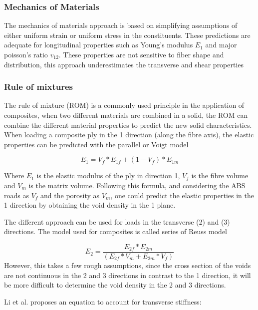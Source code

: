 \subsubsection{Mechanics of Materials}
The mechanics of materials approach is based on simplifying assumptions of either uniform strain or uniform stress in the constituents. These predictions are adequate for longitudinal properties such as Young's modulus $E_1$ and major poisson's ratio $v_{12}$. These properties are not sensitive to fiber shape and distribution, this approach underestimates the transverse and shear properties\cite{Daniel2006EngineeringMaterials}

\subsubsection{Rule of mixtures}
The rule of mixture (ROM) is a commonly used principle in the application of composites, when two different materials are combined in a solid, the ROM can combine the different material properties to predict the new solid characteristics. When loading a composite ply in the 1 direction (along the fibre axis), the elastic properties can be predicted with the parallel or Voigt model\cite{Daniel2006EngineeringMaterials} 

\begin{equation} \label{eqn:Voigt}
E_1=V_f*E_{1f}+(1-V_f)*E_{1m}
\end{equation}

Where $E_1$ is the elastic modulus of the ply in direction 1, $V_f$ is the fibre volume and $V_m$ is the matrix volume. Following this formula, and considering the ABS roads as $V_f$ and the porosity as $V_m$, one could predict the elastic properties in the 1 direction by obtaining the void density in the 1 plane.

The different approach can be used for loads in the transverse (2) and (3) directions. The model used for composites is called series of Reuss model \cite{Daniel2006EngineeringMaterials} 

\begin{equation} \label{eqn:Reuss}
E_2=\frac{E_{2f}*E_{2m}}{(E_{2f}*V_m+E_{2m}*V_f)}
\end{equation}
However, this takes a few rough assumptions, since the cross section of the voids are not continuous in the 2 and 3 directions in contrast to the 1 direction, it will be more difficult to determine the void density in the 2 and 3 directions. 

Li et al. \cite{Li2002CompositeProperties} proposes an equation to account for transverse stiffness:


